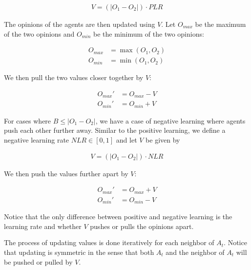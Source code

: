 \documentclass[9pt,twocolumn,twoside]{ilcss}
\begin{document}
\begin{figure}[h]
	\begin{align*}
	V = (|O_1 - O_2|) \cdot PLR
	\end{align*}
\end{figure}

The opinions of the agents are then updated using $V$. 
Let $O_{max}$ be the maximum of the two opinions and $O_{min}$ be the minimum of the two opinions:

\begin{figure}[h]
	\begin{align*}
		O_{max} &= \max(O_1, O_2)\\
		O_{min} &= \min(O_1, O_2)
	\end{align*}
\end{figure}

We then pull the two values closer together by $V$:

\begin{figure}[h]
	\begin{align*}
		O_{max}' &= O_{max} - V\\
		O_{min}' &= O_{min} + V
	\end{align*}
\end{figure}

For cases where $B \leq |O_1 - O_2|$, we have a case of negative learning where agents push each other further away. Similar to the positive learning, we define a negative learning rate $NLR \in [0,1]$ and let $V$ be given by 

\begin{figure}[h]
	\begin{align*}
	V = (|O_1 - O_2|) \cdot NLR
	\end{align*}
\end{figure}

We then push the values further apart by $V$:

\begin{figure}[h]
	\begin{align*}
		O_{max}' &= O_{max} + V\\
		O_{min}' &= O_{min} - V
	\end{align*}
\end{figure}

Notice that the only difference between positive and negative learning is the learning rate and whether $V$ pushes or pulls the opinions apart.

The process of updating values is done iteratively for each neighbor of $A_t$. 
Notice that updating is symmetric in the sense that both $A_t$ and the neighbor of $A_t$ will be pushed or pulled by $V$. 
\end{document}
